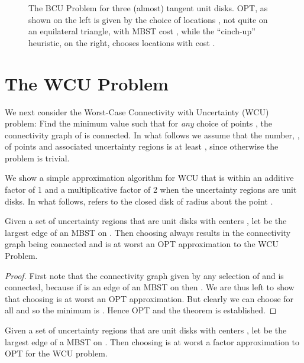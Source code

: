 \begin{figure}[h]
\centerline{}
\caption{The BCU Problem for three (almost) tangent unit disks.  OPT, as shown on the left is given by the choice of locations , not quite on an equilateral triangle, with MBST cost , while the ``cinch-up'' heuristic, on the right, chooses locations  with cost .}
\label{3_disks}
\end{figure}






\section{The WCU Problem}
\label{sec:wcu}


We next consider the Worst-Case  Connectivity with Uncertainty (WCU) problem:
Find the minimum value  such that for {\em any} choice of points , the connectivity graph  of  is connected. In what follows we assume that the number, , of points and associated uncertainty regions is at least , since otherwise the problem is trivial.

We show a simple approximation algorithm for WCU that is within an additive
factor of 1 and a multiplicative factor of 2 when the uncertainty regions are
unit disks. In what follows,  refers to the closed disk of radius  about the point .

\begin{theorem} \label{lemma:worst_case_opt+1} Given a set of uncertainty regions that are unit disks  with centers , let  be the largest edge of an MBST on .  Then choosing  always results in the connectivity graph being connected and is at worst an OPT approximation to the WCU Problem.
\end{theorem}

\begin{proof} First note that the connectivity graph given by any selection of  and   is connected, because if  is an edge of an MBST on  then .
We are thus left to show that choosing  is at worst an OPT approximation.  But clearly we can choose  for all  and so the minimum  is .  Hence OPT  and the theorem is established. 
\end{proof}

\begin{theorem} \label{lemma:worst_case_2*opt} Given a set of uncertainty regions that are unit disks  with centers , let  be the largest edge of a MBST on .  Then choosing   is at worst a factor  approximation to OPT for the WCU problem.
\end{theorem}

